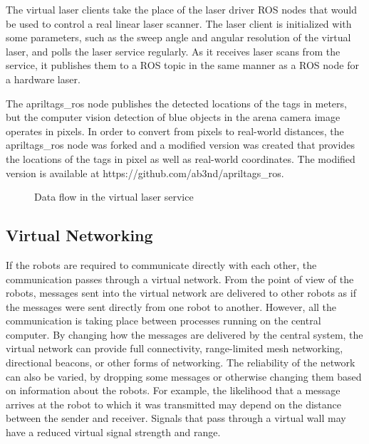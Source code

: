 The virtual laser clients take the place of the laser driver ROS nodes that would be used to control a real linear laser scanner. 
The laser client is initialized with some parameters, such as the sweep angle and angular resolution of the virtual laser, and polls the laser service regularly. 
As it receives laser scans from the service, it publishes them to a ROS topic in the same manner as a ROS node for a hardware laser. 

The apriltags\_ros node publishes the detected locations of the tags in meters, but the computer vision detection of blue objects in the arena camera image operates in pixels. 
In order to convert from pixels to real-world distances, the apriltags\_ros node was forked and a modified version was created that provides the locations of the tags in pixel as well as real-world coordinates. 
The modified version is available at https://github.com/ab3nd/apriltags\_ros.

\begin{figure}
 	\centering
	\caption{Data flow in the virtual laser service}
\end{figure}

\subsection{Virtual Networking}

If the robots are required to communicate directly with each other, the communication passes through a virtual network.
From the point of view of the robots, messages sent into the virtual network are delivered to other robots as if the messages were sent directly from one robot to another. 
However, all the communication is taking place between processes running on the central computer.
By changing how the messages are delivered by the central system, the virtual network can provide full connectivity, range-limited mesh networking, directional beacons, or other forms of networking. 
The reliability of the network can also be varied, by dropping some messages or otherwise changing them based on information about the robots. 
For example, the likelihood that a message arrives at the robot to which it was transmitted may depend on the distance between the sender and receiver.
Signals that pass through a virtual wall may have a reduced virtual signal strength and range.

